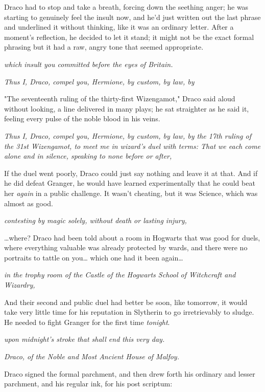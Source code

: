 Draco had to stop and take a breath, forcing down the seething anger; he was 
starting to genuinely feel the insult now, and he'd just written out the last 
phrase and underlined it without thinking, like it was an ordinary letter. 
After a moment's reflection, he decided to let it stand; it might not be the 
exact formal phrasing but it had a raw, angry tone that seemed appropriate.

\emph{which insult you committed before the eyes of Britain.}

\emph{Thus I, Draco, compel you, Hermione, by custom, by law, by}

"The seventeenth ruling of the thirty-first Wizengamot," Draco said aloud 
without looking, a line delivered in many plays; he sat straighter as he said 
it, feeling every pulse of the noble blood in his veins.

\emph{Thus I, Draco, compel you, Hermione, by custom, by law, by the 17th 
ruling of the 31st Wizengamot, to meet me in wizard's duel with terms: That we 
each come alone and in silence, speaking to none before or after,}

If the duel went poorly, Draco could just say nothing and leave it at that. And 
if he did defeat Granger, he would have learned experimentally that he could 
beat her \emph{again} in a public challenge. It wasn't cheating, but it was 
Science, which was almost as good.

\emph{contesting by magic solely, without death or lasting injury,}

{\ldots}where? Draco had been told about a room in Hogwarts that was good for 
duels, where everything valuable was already protected by wards, and there were 
no portraits to tattle on you{\ldots} which one had it been again{\ldots}

\emph{in the trophy room of the Castle of the Hogwarts School of Witchcraft and 
Wizardry,}

And their second and public duel had better be soon, like tomorrow, it would 
take very little time for his reputation in Slytherin to go irretrievably to 
sludge. He needed to fight Granger for the first time \emph{tonight}.

\emph{upon midnight's stroke that shall end this very day.}

\emph{Draco, of the Noble and Most Ancient House of Malfoy.}

Draco signed the formal parchment, and then drew forth his ordinary and lesser 
parchment, and his regular ink, for his post scriptum:


